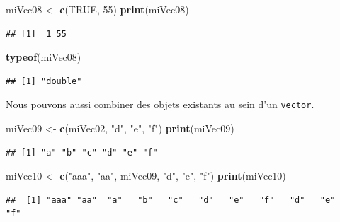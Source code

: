 \documentclass[]{book}
\newenvironment{Shaded}{\begin{snugshade}}{\end{snugshade}}
\newcommand{\DecValTok}[1]{\textcolor[rgb]{0.00,0.00,0.81}{#1}}
\newcommand{\KeywordTok}[1]{\textcolor[rgb]{0.13,0.29,0.53}{\textbf{#1}}}
\newcommand{\NormalTok}[1]{#1}
\newcommand{\OtherTok}[1]{\textcolor[rgb]{0.56,0.35,0.01}{#1}}
\newcommand{\StringTok}[1]{\textcolor[rgb]{0.31,0.60,0.02}{#1}}
\begin{document}
\begin{Shaded}
\begin{Highlighting}[]
\NormalTok{miVec08 <-}\StringTok{ }\KeywordTok{c}\NormalTok{(}\OtherTok{TRUE}\NormalTok{, }\DecValTok{55}\NormalTok{)}
\KeywordTok{print}\NormalTok{(miVec08)}
\end{Highlighting}
\end{Shaded}

\begin{verbatim}
## [1]  1 55
\end{verbatim}

\begin{Shaded}
\begin{Highlighting}[]
\KeywordTok{typeof}\NormalTok{(miVec08)}
\end{Highlighting}
\end{Shaded}

\begin{verbatim}
## [1] "double"
\end{verbatim}

Nous pouvons aussi combiner des objets existants au sein d'un \texttt{vector}.

\begin{Shaded}
\begin{Highlighting}[]
\NormalTok{miVec09 <-}\StringTok{ }\KeywordTok{c}\NormalTok{(miVec02, }\StringTok{"d"}\NormalTok{, }\StringTok{"e"}\NormalTok{, }\StringTok{"f"}\NormalTok{)}
\KeywordTok{print}\NormalTok{(miVec09)}
\end{Highlighting}
\end{Shaded}

\begin{verbatim}
## [1] "a" "b" "c" "d" "e" "f"
\end{verbatim}

\begin{Shaded}
\begin{Highlighting}[]
\NormalTok{miVec10 <-}\StringTok{ }\KeywordTok{c}\NormalTok{(}\StringTok{"aaa"}\NormalTok{, }\StringTok{"aa"}\NormalTok{, miVec09, }\StringTok{"d"}\NormalTok{, }\StringTok{"e"}\NormalTok{, }\StringTok{"f"}\NormalTok{)}
\KeywordTok{print}\NormalTok{(miVec10)}
\end{Highlighting}
\end{Shaded}

\begin{verbatim}
##  [1] "aaa" "aa"  "a"   "b"   "c"   "d"   "e"   "f"   "d"   "e"   "f"
\end{verbatim}
\end{document}
